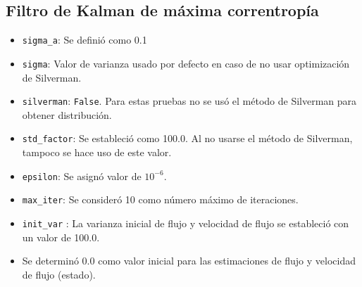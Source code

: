 \subsection*{Filtro de Kalman de m\'axima correntrop\'ia}
\begin{itemize}
\item \texttt{sigma\_a}: Se defini\'o como 0.1
\item \texttt{sigma}: Valor de varianza usado por defecto en caso de no usar optimizaci\'on de Silverman.
\item \texttt{silverman}: \texttt{False}. Para estas pruebas no se us\'o el m\'etodo de Silverman para obtener distribuci\'on.
\item \texttt{std\_factor}: Se estableci\'o como 100.0. Al no usarse el m\'etodo de Silverman, tampoco se hace uso de este valor.
\item \texttt{epsilon}: Se asign\'o valor de $10^{-6}$. 
\item \texttt{max\_iter}: Se consider\'o 10 como n\'umero m\'aximo de iteraciones. 
\item \texttt{init\_var} : La varianza inicial de flujo y velocidad de flujo se estableci\'o con un valor de 100.0.
\item Se determin\'o 0.0 como valor inicial para las estimaciones de flujo y velocidad de flujo (estado).

\end{itemize}
